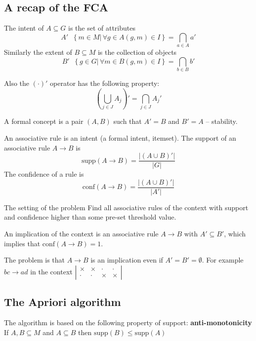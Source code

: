 \documentclass[a4paper]{article}
\newcommand{\obj}[1]{{\left\{ #1 \right \}}}
\newcommand{\brac}[1]{{\left ( #1 \right )}}
\newcommand{\induc}[1]{{\left . #1 \right \vert}}
\newcommand{\abs}[1]{{\left | #1 \right |}}
\newcommand{\defn}{\mathop{\overset{\Delta}{=}}\nolimits}
\begin{document}

\subsection{A recap of the FCA} %
\label{sub:a_recap_of_the_fca}

The intent of $A\subseteq G$ is the set of attributes
\[A' \defn \obj{\induc{m\in M}\,\forall g\in A (g,m)\in I} = \bigcap_{a\in A} a'\]
Similarly the extent of $B\subseteq M$ is the collection of objects
\[B' \defn \obj{\induc{g\in G}\,\forall m\in B (g,m)\in I} = \bigcap_{b\in B} b'\]

Also the ${(\cdot)}'$ operator has the following property:
\[\brac{\bigcup_{j\in J}A_j}' = \bigcap_{j\in J}A_j'\]

A formal concept is a pair $(A,B)$ such that $A'=B$ and $B'=A$ -- stability. 


An associative rule is an intent (a formal intent, itemset). The support of an associative rule $A\to B$ is
\[\text{supp}(A\to B) = \frac{\abs{\brac{A\cup B}'}}{\abs{G}}\]
The confidence of a rule is 
\[\text{conf}(A\to B) = \frac{\abs{\brac{A\cup B}'}}{\abs{A'}}\]

The setting of the problem
Find all associative rules of the context with support and confidence higher than some pre-set threshold value.

An implication of the context is an associative rule $A\to B$ with $A'\subseteq B'$, which implies that $\text{conf}(A\to B) = 1$.

The problem is that $A\to B$ is an implication even if $A'=B'=\emptyset$.
For example $bc\to ad$ in the context $\abs{\begin{matrix}\times & \times & \cdot & \cdot\\ \cdot & \cdot & \times & \times\end{matrix}}$

\subsection{The Apriori algorithm} %
\label{sub:the_apriori_algorithm}
The algorithm is based on the following property of support:
\noindent\textbf{anti-monotonicity}\hfill\\
If $A,B\subseteq M$ and $A\subseteq B$ then $\text{supp}(B) \leq \text{supp}(A)$
\end{document}
